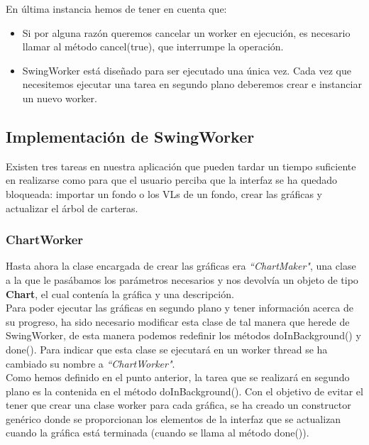 \documentclass[12pt, a4paper]{book}
\begin{document}
En última instancia hemos de tener en cuenta que:

\begin{itemize}
	\item Si por alguna razón queremos cancelar un worker en ejecución, es necesario llamar al método cancel(true), que interrumpe la operación.
	\item SwingWorker está diseñado para ser ejecutado una única vez. Cada vez que necesitemos ejecutar una tarea en segundo plano deberemos crear e instanciar un nuevo worker.
\end{itemize}


\newpage

\subsection{Implementación de SwingWorker}

Existen tres tareas en nuestra aplicación que pueden tardar un tiempo suficiente en realizarse como para que el usuario perciba que la interfaz se ha quedado bloqueada: importar un fondo o los \gls{VL}s de un fondo, crear las gráficas y actualizar el árbol de carteras.

\subsubsection{ChartWorker}

Hasta ahora la clase encargada de crear las gráficas era \textit{``ChartMaker"}, una clase a la que le pasábamos los parámetros necesarios y nos devolvía un objeto de tipo \textbf{Chart}, el cual contenía la gráfica y una descripción.\\

Para poder ejecutar las gráficas en segundo plano y tener información acerca de su progreso, ha sido necesario modificar esta clase de tal manera que herede de SwingWorker, de esta manera podemos redefinir los métodos doInBackground() y done(). Para indicar que esta clase se ejecutará en un worker thread se ha cambiado su nombre a \textit{``ChartWorker"}. \\

Como hemos definido en el punto anterior, la tarea que se realizará en segundo plano es la contenida en el método doInBackground(). Con el objetivo de evitar el tener que crear una clase worker para cada gráfica, se ha creado un constructor genérico donde se proporcionan los elementos de la interfaz que se actualizan cuando la gráfica está terminada (cuando se llama al método done()).\\
\end{document}
